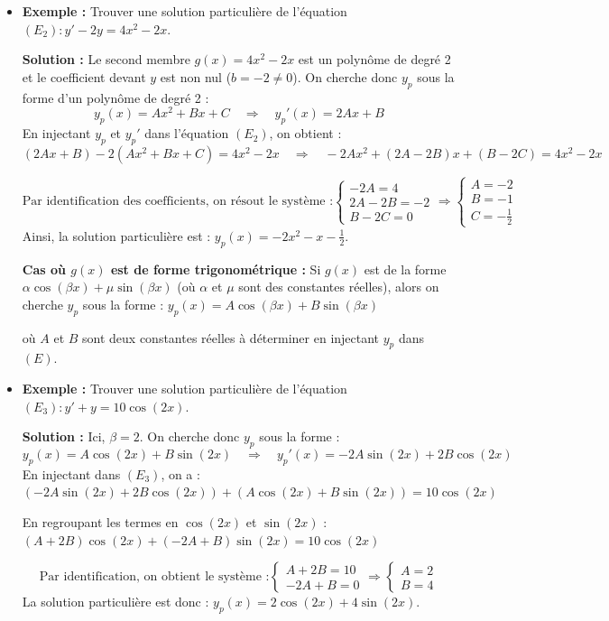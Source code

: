 \documentclass[12pt,a4paper]{article}
\begin{document}
\begin{itemize}

    \item 
    \noindent\textbf{Exemple :} 
    Trouver une solution particulière de l'équation $(E_2) : y' - 2y = 4x^2 - 2x$.
    
    \textbf{Solution :} 
    Le second membre $g(x) = 4x^2 - 2x$ est un polynôme de degré 2 et le coefficient devant $y$ est non nul ($b = -2 \neq 0$). On cherche donc $y_p$ sous la forme d'un polynôme de degré 2 : 
    \[ y_p(x) = Ax^2 + Bx + C \quad \Longrightarrow \quad y_p'(x) = 2Ax + B \]
    En injectant $y_p$ et $y_p'$ dans l'équation $(E_2)$, on obtient :
    \[ (2Ax + B) - 2(Ax^2 + Bx + C) = 4x^2 - 2x \quad \Longrightarrow \quad -2Ax^2 + (2A - 2B)x + (B - 2C) = 4x^2 - 2x \]
    
    \[\text{Par identification des coefficients, on résout le système :}
    \begin{cases}
    -2A = 4 \\
    2A - 2B = -2 \\
    B - 2C = 0
    \end{cases}
    \Longrightarrow
    \begin{cases}
    A = -2 \\
    B = -1 \\
    C = -\frac{1}{2}
    \end{cases}
    \]
    Ainsi, la solution particulière est : $y_p(x) = -2x^2 - x - \frac{1}{2}$.
    
    \textbf{Cas où $g(x)$ est de forme trigonométrique :} Si $g(x)$ est de la forme $\alpha \cos(\beta x) + \mu \sin(\beta x)$ (où $\alpha$ et $\mu$ sont des constantes réelles), alors on cherche $y_p$ sous la forme :
    $ y_p(x) = A \cos(\beta x) + B \sin(\beta x) $
    
    où $A$ et $B$ sont deux constantes réelles à déterminer en injectant $y_p$ dans $(E)$.
    
    \item 
    \noindent\textbf{Exemple :} 
    Trouver une solution particulière de l'équation $(E_3) : y' + y = 10\cos(2x)$.
    
    \textbf{Solution :} 
    Ici, $\beta = 2$. On cherche donc $y_p$ sous la forme :
    \[ y_p(x) = A \cos(2x) + B \sin(2x) \quad \Longrightarrow \quad y_p'(x) = -2A \sin(2x) + 2B \cos(2x) \]
    En injectant dans $(E_3)$, on a :
    $ (-2A \sin(2x) + 2B \cos(2x)) + (A \cos(2x) + B \sin(2x)) = 10\cos(2x) $
    
    En regroupant les termes en $\cos(2x)$ et $\sin(2x)$ :
    $ (A + 2B)\cos(2x) + (-2A + B)\sin(2x) = 10\cos(2x) $
    
    
    \[\text{Par identification, on obtient le système :}
    \begin{cases}
    A + 2B = 10 \\
    -2A + B = 0 
    \end{cases}
    \Longrightarrow
    \begin{cases}
     A = 2 \\
    B = 4
    \end{cases}
    \]
    La solution particulière est donc : $y_p(x) = 2\cos(2x) + 4\sin(2x)$.
\end{itemize}
\end{document}
